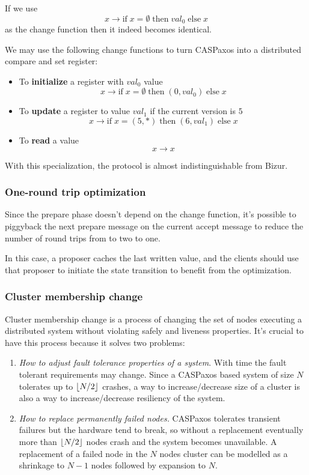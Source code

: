\documentclass[12pt]{article}
\theoremstyle{definition}
\DeclarePairedDelimiter{\floor}{\lfloor}{\rfloor}
\begin{document}
If we use
$$x \to \mbox{if}\; x = \emptyset \;\mbox{then}\; val_0\; \mbox{else}\; x$$
as the change function then it indeed becomes identical.

We may use the following change functions to turn CASPaxos into a distributed compare and set register:
\begin{itemize}
  \item To {\bf initialize} a register with $val_0$ value
  $$x \to \mbox{if}\; x = \emptyset \;\mbox{then}\; (0, val_0)\; \mbox{else}\; x$$
  
  \item To {\bf update} a register to value $val_1$ if the current version is $5$
  $$x \to \mbox{if}\; x = (5, \ast) \;\mbox{then}\; (6, val_1)\; \mbox{else}\; x$$
  
  \item To {\bf read} a value
  $$x \to x$$
\end{itemize}

With this specialization, the protocol is almost indistinguishable from Bizur\cite{bizur}.

\subsubsection{One-round trip optimization}

Since the prepare phase doesn't depend on the change function, it's possible to piggyback the next prepare message on the current accept message to reduce the number of round trips from to two to one.

In this case, a proposer caches the last written value, and the clients should use that proposer to initiate the state transition to benefit from the optimization.

\subsubsection{Cluster membership change}

Cluster membership change is a process of changing the set of nodes executing a distributed system without violating safely and liveness properties. It's crucial to have this process because it solves two problems:

\begin{enumerate}
  \item {\it How to adjust fault tolerance properties of a system}. With time the fault tolerant requirements may change. Since a CASPaxos based system of size $N$ tolerates up to $\floor{N/2}$ crashes, a way to increase/decrease size of a cluster is also a way to increase/decrease resiliency of the system.

  \item {\it How to replace permanently failed nodes.} CASPaxos tolerates transient failures but the hardware tend to break, so without a replacement eventually more than $\floor{N/2}$ nodes crash and the system becomes unavailable. A replacement of a failed node in the $N$ nodes cluster can be modelled as a shrinkage to $N-1$ nodes followed by expansion to $N$.
\end{enumerate}
\end{document}
